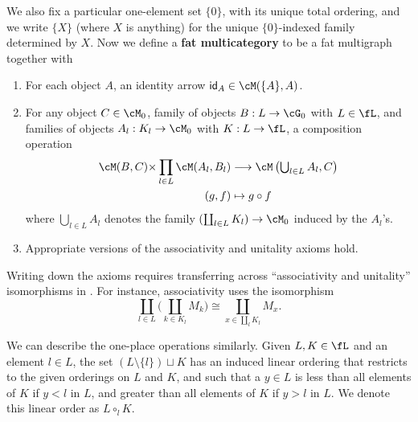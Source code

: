 \documentclass{book}
\def\idfunc{\mathsf{id}}
\begin{document}
We also fix a particular one-element set $\{0\}$, with its unique total ordering, and we write $\{X\}$ (where $X$ is anything) for the unique $\{0\}$-indexed family determined by $X$.
Now we define a \textbf{fat multicategory} to be a fat multigraph \cM together with
\begin{enumerate}
\item For each object $A$, an identity arrow $\idfunc_A \in \cM(\{A\},A)$.
\item For any object $C\in\cM_0$, family of objects $B:L\to \cG_0$ with $L\in\fL$, and families of objects $A_l : K_l \to \cM_0$ with $K:L\to \fL$, a composition operation
  \begin{align*}
    \cM(B,C) \times \prod_{l\in L} \cM(A_l,B_l) &\too \cM\left( \textstyle\bigcup_{l\in L} A_l, C\right)\\
    (g,f) &\mapsto g\circ f
  \end{align*}
  where $\bigcup_{l\in L} A_l$ denotes the family $(\coprod_{l\in L} K_l) \to \cM_0$ induced by the $A_l$'s.
\item Appropriate versions of the associativity and unitality axioms hold.
\end{enumerate}
Writing down the axioms requires transferring across ``associativity and unitality'' isomorphisms in \fL.
For instance, associativity uses the isomorphism
\[\textstyle \coprod_{l\in L} \Big(\coprod_{k\in K_l} M_k\Big) \cong \coprod_{x\in \coprod_l K_l} M_x. \]

We can describe the one-place operations similarly.
Given $L,K\in\fL$ and an element $l\in L$, the set $(L\setminus \{l\}) \sqcup K$ has an induced linear ordering that restricts to the given orderings on $L$ and $K$, and such that a $y\in L$ is less than all elements of $K$ if $y<l$ in $L$, and greater than all elements of $K$ if $y>l$ in $L$.
We denote this linear order as $L\circ_l K$.
\end{document}
